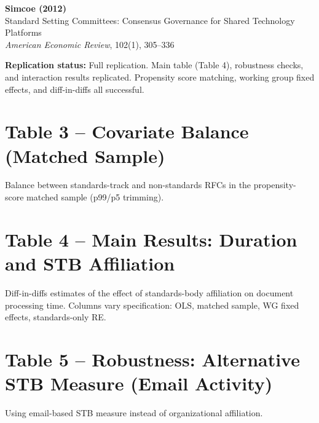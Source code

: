 \documentclass[12pt]{article}
\begin{document}
\begin{center}
{\Large\bfseries Simcoe (2012)}\\
{\large Standard Setting Committees: Consensus Governance for Shared Technology Platforms}\\
\vspace{0.5em}
{\normalsize \textit{American Economic Review}, 102(1), 305--336}
\end{center}

\vspace{1em}
\noindent\textbf{Replication status:} Full replication.
Main table (Table 4), robustness checks, and interaction results replicated.
Propensity score matching, working group fixed effects, and diff-in-diffs all successful.

\tableofcontents

\clearpage
\section{Table 3 -- Covariate Balance (Matched Sample)}

Balance between standards-track and non-standards RFCs in the
propensity-score matched sample (p99/p5 trimming).

\vspace{1em}


\clearpage
\section{Table 4 -- Main Results: Duration and STB Affiliation}

Diff-in-diffs estimates of the effect of standards-body affiliation on
document processing time. Columns vary specification:
OLS, matched sample, WG fixed effects, standards-only RE.

\vspace{1em}


\clearpage
\section{Table 5 -- Robustness: Alternative STB Measure (Email Activity)}

Using email-based STB measure instead of organizational affiliation.
\end{document}
